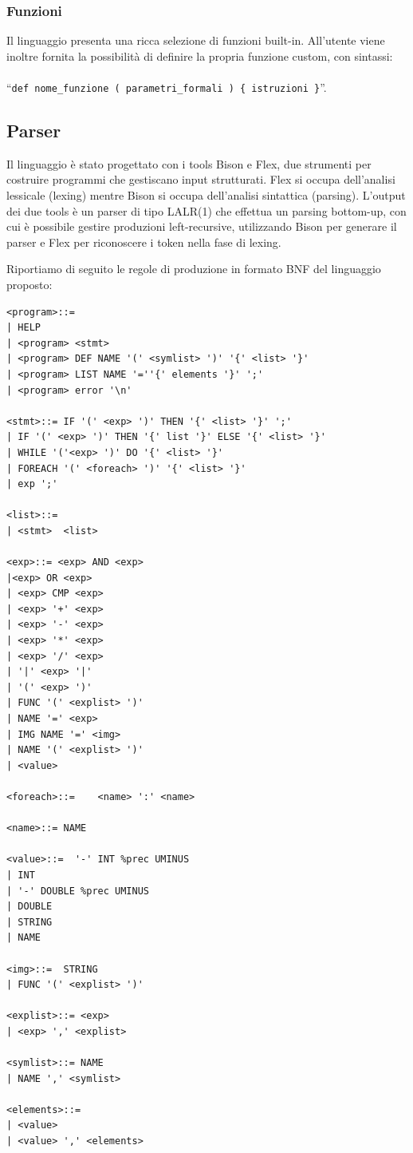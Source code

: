 \documentclass[10pt]{article}
\begin{document}
\subsubsection{Funzioni}
Il linguaggio presenta una ricca selezione di funzioni built-in. All'utente viene inoltre fornita la possibilità di definire la propria funzione custom, con sintassi:\\\\ ``\texttt{def nome\_funzione ( parametri\_formali ) \{ istruzioni \}}''.
\clearpage
\subsection{Parser}
Il linguaggio è stato progettato con i tools Bison e Flex, due strumenti per costruire programmi che gestiscano input strutturati. Flex si occupa dell'analisi lessicale (lexing) mentre Bison si occupa dell'analisi sintattica (parsing). L'output dei due tools è un parser di tipo LALR(1) che effettua un parsing bottom-up, con cui è possibile gestire  produzioni left-recursive, utilizzando Bison per generare il parser e Flex per riconoscere i token nella fase di lexing.

Riportiamo di seguito le regole di produzione in formato BNF del linguaggio proposto:

\begin{lstlisting}
<program>::=
| HELP
| <program> <stmt>    
| <program> DEF NAME '(' <symlist> ')' '{' <list> '}' 
| <program> LIST NAME '=''{' elements '}' ';' 
| <program> error '\n'

<stmt>::= IF '(' <exp> ')' THEN '{' <list> '}' ';'                
| IF '(' <exp> ')' THEN '{' list '}' ELSE '{' <list> '}'   
| WHILE '('<exp> ')' DO '{' <list> '}'                    
| FOREACH '(' <foreach> ')' '{' <list> '}'                 
| exp ';'

<list>::=                               
| <stmt>  <list>                    

<exp>::= <exp> AND <exp>          
|<exp> OR <exp>           
| <exp> CMP <exp>          
| <exp> '+' <exp>          
| <exp> '-' <exp>       
| <exp> '*' <exp>        
| <exp> '/' <exp>       
| '|' <exp> '|'          
| '(' <exp> ')'          
| FUNC '(' <explist> ')' 
| NAME '=' <exp>         
| IMG NAME '=' <img>     
| NAME '(' <explist> ')' 
| <value>                

<foreach>::=    <name> ':' <name>        

<name>::= NAME                       

<value>::=  '-' INT %prec UMINUS      
| INT                          
| '-' DOUBLE %prec UMINUS      
| DOUBLE                       
| STRING                       
| NAME                         

<img>::=  STRING              
| FUNC '(' <explist> ')' 

<explist>::= <exp>          
| <exp> ',' <explist>  

<symlist>::= NAME         
| NAME ',' <symlist> 

<elements>::=                
| <value>               
| <value> ',' <elements>  

\end{lstlisting}
\end{document}
